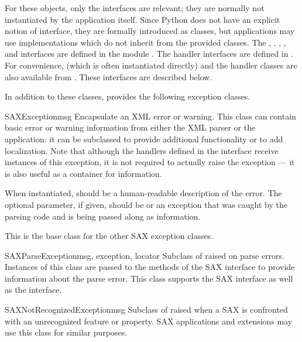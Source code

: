 For these objects, only the interfaces are relevant; they are normally
not instantiated by the application itself.  Since Python does not have
an explicit notion of interface, they are formally introduced as
classes, but applications may use implementations which do not inherit
from the provided classes.  The , ,
, , and
 interfaces are defined in the module
.  The handler interfaces are defined in
.  For convenience, 
(which is often instantiated directly) and the handler classes are
also available from .  These interfaces are described
below.

In addition to these classes,  provides the following
exception classes.

\begin{excclassdesc}{SAXException}{msg}
  Encapsulate an XML error or warning.  This class can contain basic
  error or warning information from either the XML parser or the
  application: it can be subclassed to provide additional
  functionality or to add localization.  Note that although the
  handlers defined in the  interface receive
  instances of this exception, it is not required to actually raise
  the exception --- it is also useful as a container for information.

  When instantiated,  should be a human-readable description
  of the error.  The optional  parameter, if given,
  should be  or an exception that was caught by the parsing
  code and is being passed along as information.

  This is the base class for the other SAX exception classes.
\end{excclassdesc}

\begin{excclassdesc}{SAXParseException}{msg, exception, locator}
  Subclass of  raised on parse errors.
  Instances of this class are passed to the methods of the SAX
   interface to provide information about the
  parse error.  This class supports the SAX  interface
  as well as the  interface.
\end{excclassdesc}

\begin{excclassdesc}{SAXNotRecognizedException}{msg}
  Subclass of  raised when a SAX
   is confronted with an unrecognized feature or
  property.  SAX applications and extensions may use this class for
  similar purposes.
\end{excclassdesc}

